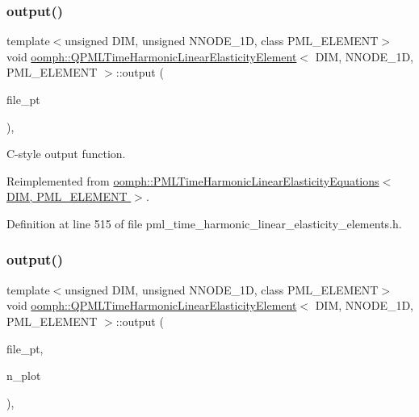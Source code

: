 \subsubsection{\texorpdfstring{output()}{output()}\hspace{0.1cm}{\footnotesize\ttfamily [3/4]}}
{\footnotesize\ttfamily template$<$unsigned D\+IM, unsigned N\+N\+O\+D\+E\+\_\+1D, class P\+M\+L\+\_\+\+E\+L\+E\+M\+E\+NT$>$ \\
void \hyperlink{classoomph_1_1QPMLTimeHarmonicLinearElasticityElement}{oomph\+::\+Q\+P\+M\+L\+Time\+Harmonic\+Linear\+Elasticity\+Element}$<$ D\+IM, N\+N\+O\+D\+E\+\_\+1D, P\+M\+L\+\_\+\+E\+L\+E\+M\+E\+NT $>$\+::output (\begin{DoxyParamCaption}\item[{F\+I\+LE $\ast$}]{file\+\_\+pt }\end{DoxyParamCaption})\hspace{0.3cm}{\ttfamily [inline]}, {\ttfamily [virtual]}}



C-\/style output function. 



Reimplemented from \hyperlink{classoomph_1_1PMLTimeHarmonicLinearElasticityEquations_a4f333b308aa6bfd8e70a458574ed47fe}{oomph\+::\+P\+M\+L\+Time\+Harmonic\+Linear\+Elasticity\+Equations$<$ D\+I\+M, P\+M\+L\+\_\+\+E\+L\+E\+M\+E\+N\+T $>$}.



Definition at line 515 of file pml\+\_\+time\+\_\+harmonic\+\_\+linear\+\_\+elasticity\+\_\+elements.\+h.

\mbox{\label{classoomph_1_1QPMLTimeHarmonicLinearElasticityElement_a0065cae9f58583e0354aa00cbe6122af}} 
\subsubsection{\texorpdfstring{output()}{output()}\hspace{0.1cm}{\footnotesize\ttfamily [4/4]}}
{\footnotesize\ttfamily template$<$unsigned D\+IM, unsigned N\+N\+O\+D\+E\+\_\+1D, class P\+M\+L\+\_\+\+E\+L\+E\+M\+E\+NT$>$ \\
void \hyperlink{classoomph_1_1QPMLTimeHarmonicLinearElasticityElement}{oomph\+::\+Q\+P\+M\+L\+Time\+Harmonic\+Linear\+Elasticity\+Element}$<$ D\+IM, N\+N\+O\+D\+E\+\_\+1D, P\+M\+L\+\_\+\+E\+L\+E\+M\+E\+NT $>$\+::output (\begin{DoxyParamCaption}\item[{F\+I\+LE $\ast$}]{file\+\_\+pt,  }\item[{const unsigned \&}]{n\+\_\+plot }\end{DoxyParamCaption})\hspace{0.3cm}{\ttfamily [inline]}, {\ttfamily [virtual]}}



